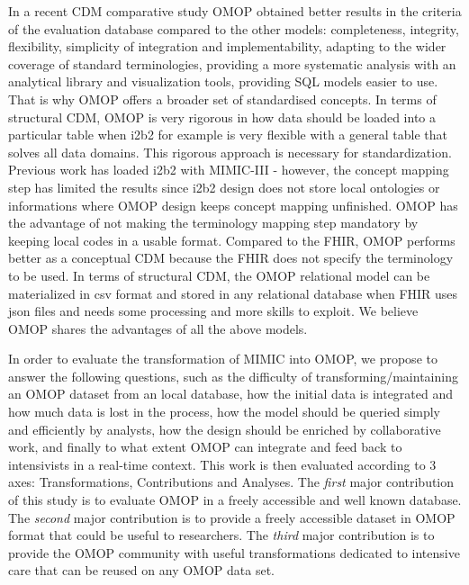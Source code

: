 In a recent CDM comparative study \cite{cdm-review,omop-vs-pcornet}
OMOP obtained better results in the criteria of the evaluation database 
compared to the other models: completeness, integrity, flexibility, simplicity 
of integration and implementability, adapting to the wider coverage 
of standard terminologies, providing a more systematic analysis 
with an analytical library and visualization tools, providing SQL models easier to use.
That is why OMOP offers a broader set of standardised concepts.
In terms of structural CDM, OMOP is very rigorous in how data should be loaded 
into a particular table when i2b2 for example is very flexible 
with a general table that solves all data domains. This rigorous approach 
is necessary for standardization. 
Previous work has loaded i2b2 with MIMIC-III \cite{mimic-i2b2} - 
however, the concept mapping step has limited the results since i2b2 design 
does not store local ontologies or informations where OMOP design keeps 
concept mapping unfinished. OMOP has the advantage of not making the terminology 
mapping step mandatory by keeping local codes in a usable format. 
Compared to the FHIR, OMOP performs better as a conceptual CDM because 
the FHIR does not specify the terminology to be used. In terms of structural CDM, 
the OMOP relational model can be materialized in csv format
 and stored in any relational database when FHIR uses json files and 
needs some processing and more skills to exploit.
We believe OMOP shares the advantages of all the above models.

In order to evaluate the transformation of MIMIC into OMOP, 
we propose to answer the following questions, 
such as the difficulty of transforming/maintaining an OMOP dataset 
from an local database, how the initial data is integrated 
and how much data is lost in the process, how the model should be queried simply 
and efficiently by analysts, how the design should be enriched by collaborative work, 
and finally to what extent OMOP can integrate and feed back to intensivists 
in a real-time context. This work is then evaluated according to 3 axes: 
Transformations, Contributions and Analyses. 
The \emph{first} major contribution of this study is to evaluate OMOP in a freely 
accessible and well known database. The \emph{second} major contribution is to provide 
a freely accessible dataset in OMOP format that could be useful to researchers. 
The \emph{third} major contribution is to provide the OMOP community with useful 
transformations dedicated to intensive care that can be reused on any OMOP data set.
